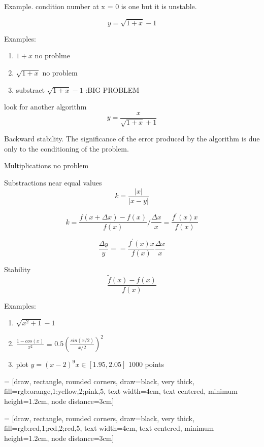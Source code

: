 Example. condition number at x = 0 is one but it is unstable. 

 
$$
y = \sqrt{1+x} - 1 
$$   


Examples: 
\begin{enumerate} 
\item $1+ x $ no problme
\item $ \sqrt{1+x} $ no problem 
\item substract  $ \sqrt{1+x} - 1 $ :BIG PROBLEM 

\end{enumerate}
look for another algorithm 
$$
y =  \frac{x}{\sqrt{1+x} + 1}
$$

Backward stability. The significance of the error produced by the algorithm is due only to
the conditioning of the problem. 


Multiplications no problem 

Substractions near equal values 
$$ 
k = \frac{ | x | }{ |x - y |}
$$   
    
    $$
     k = \frac{ f(x+\Delta x) - f(x) }{ f(x)} / \frac{ \Delta x  }{ x} = \frac{ f^\prime(x) x }{ f(x)}  
    $$
    
    $$
        \frac{\Delta y}{ y }  =  = \frac{ f^\prime(x) x }{ f(x)}  \frac{\Delta x}{ x}
    $$
    
    
    Stability 
    $$
      \frac{\tilde{f} (x) - f(x)   }{ f(x) }
    $$

Examples: 
\begin{enumerate} 
\item $\sqrt{x^2+1} -1$ 
\item $ \frac{1- cos(x)}{ x^2} $ = $ 0.5 ( \frac{ sin(x/2)}   {x/2 } )^2 $
\item plot $ y = (x-2)^9 x \in [ 1.95, 2.05] $ 1000 points 


\end{enumerate}




 \usetikzlibrary{shapes.geometric, arrows}
 
 \usetikzlibrary{positioning} 
 
  = [draw, rectangle, rounded corners, draw=black, very thick,
 fill={rgb:orange,1;yellow,2;pink,5},
 text width=4cm, text centered, minimum height=1.2cm, node distance=3cm]
 
  = [draw, rectangle, rounded corners, draw=black, very thick,
  fill={rgb:red,1;red,2;red,5},
  text width=4cm, text centered, minimum height=1.2cm, node distance=3cm]
 

